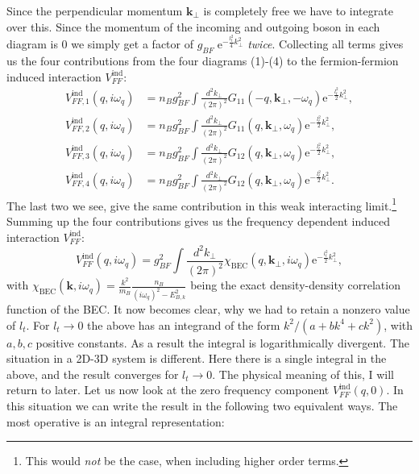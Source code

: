 Since the perpendicular momentum $\mathbf{k}_\perp$ is completely free we have to integrate over this. Since the momentum of the incoming and outgoing boson in each diagram is 0 we simply get a factor of $g_{BF}\; \text{e}^{-\frac{l_t^2}{4}k_\perp^2}$ \textit{twice}. Collecting all terms gives us the four contributions from the four diagrams (1)-(4) to the fermion-fermion induced interaction $V_{FF}^\text{ind}$: 
\begin{align}
V_{FF,1}^\text{ind}(q,i\omega_q) &= n_Bg_{BF}^2\int\frac{d^2k_\perp}{(2\pi)^2}G_{11}(-q,\mathbf{k}_\perp,-\omega_q)\text{e}^{-\frac{l_t^2}{2}k_\perp^2}, \nonumber \\
V_{FF,2}^\text{ind}(q,i\omega_q) &= n_Bg_{BF}^2\int\frac{d^2k_\perp}{(2\pi)^2}G_{11}(q,\mathbf{k}_\perp,\omega_q)\text{e}^{-\frac{l_t^2}{2}k_\perp^2}, \nonumber \\
V_{FF,3}^\text{ind}(q,i\omega_q) &= n_Bg_{BF}^2\int\frac{d^2k_\perp}{(2\pi)^2}G_{12}(q,\mathbf{k}_\perp,\omega_q)\text{e}^{-\frac{l_t^2}{2}k_\perp^2}, \nonumber \\
V_{FF,4}^\text{ind}(q,i\omega_q) &= n_Bg_{BF}^2\int\frac{d^2k_\perp}{(2\pi)^2}G_{12}(q,\mathbf{k}_\perp,\omega_q)\text{e}^{-\frac{l_t^2}{2}k_\perp^2}. 
\end{align}
The last two we see, give the same contribution in this weak interacting limit.\footnote{This would \textit{not} be the case, when including higher order terms.} Summing up the four contributions gives us the frequency dependent induced interaction $V_{FF}^\text{ind}$:
\begin{equation}
V_{FF}^\text{ind}(q,i\omega_q) = g_{BF}^2\int\frac{d^2k_\perp}{(2\pi)^2}\chi_\text{BEC}(q,\mathbf{k}_\perp,i\omega_q)\text{e}^{-\frac{l_t^2}{2}k_\perp^2}, 
\label{eq.VFFindXBEC}
\end{equation}
with $\chi_\text{BEC}(\mathbf{k},i\omega_q) = \frac{k^2}{m_B}\frac{n_B}{(i\omega_q)^2-E_{B,k}^2}$ being the exact density-density correlation function of the BEC. It now becomes clear, why we had to retain a nonzero value of $l_t$. For $l_t\to 0$ the above has an integrand of the form $k^2/(a+bk^4+ck^2)$, with $a,b,c$ positive constants. As a result the integral is logarithmically divergent. The situation in a 2D-3D system is different. Here there is a single integral in the above, and the result converges for $l_t\to 0$. The physical meaning of this, I will return to later. Let us now look at the zero frequency component $V_{FF}^\text{ind}(q,0)$. In this situation we can write the result in the following two equivalent ways. The most operative is an integral representation:
